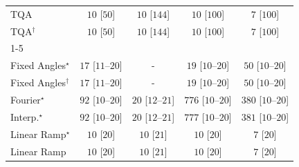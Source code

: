 \begin{tabular}{l|cccc|}
TQA & {\cellcolor[HTML]{F6FCF4}} \color[HTML]{000000} $10$ [$50$] & {\cellcolor[HTML]{F6FCF4}} \color[HTML]{000000} $10$ [$144$] & {\cellcolor[HTML]{F6FCF4}} \color[HTML]{000000} $10$ [$100$] & {\cellcolor[HTML]{F6FCF4}} \color[HTML]{000000} $7$ [$100$] \\
TQA$^\dagger$ & {\cellcolor[HTML]{F6FCF4}} \color[HTML]{000000} $10$ [$50$] & {\cellcolor[HTML]{F6FCF4}} \color[HTML]{000000} $10$ [$144$] & {\cellcolor[HTML]{F6FCF4}} \color[HTML]{000000} $10$ [$100$] & {\cellcolor[HTML]{F6FCF4}} \color[HTML]{000000} $7$ [$100$] \\
\cline{1-5}
\multicolumn{5}{c}{\rule{0pt}{8pt}SV} \\
\midrule
Fixed Angles$^\star$ & {\cellcolor[HTML]{F4FBF2}} \color[HTML]{000000} $17$ [$11$--$20$] & {\cellcolor[HTML]{000000}} \color[HTML]{F1F1F1} {\cellcolor{white}} \color{black} - & {\cellcolor[HTML]{F4FBF2}} \color[HTML]{000000} $19$ [$10$--$20$] & {\cellcolor[HTML]{EEF8EA}} \color[HTML]{000000} $50$ [$10$--$20$] \\
Fixed Angles$^\dagger$ & {\cellcolor[HTML]{F4FBF2}} \color[HTML]{000000} $17$ [$11$--$20$] & {\cellcolor[HTML]{000000}} \color[HTML]{F1F1F1} {\cellcolor{white}} \color{black} - & {\cellcolor[HTML]{F4FBF2}} \color[HTML]{000000} $19$ [$10$--$20$] & {\cellcolor[HTML]{EEF8EA}} \color[HTML]{000000} $50$ [$10$--$20$] \\
Fourier$^\star$ & {\cellcolor[HTML]{E6F5E1}} \color[HTML]{000000} $92$ [$10$--$20$] & {\cellcolor[HTML]{F4FBF1}} \color[HTML]{000000} $20$ [$12$--$21$] & {\cellcolor[HTML]{00441B}} \color[HTML]{F1F1F1} $776$ [$10$--$20$] & {\cellcolor[HTML]{78C679}} \color[HTML]{000000} $380$ [$10$--$20$] \\
Interp.$^\star$ & {\cellcolor[HTML]{E6F5E1}} \color[HTML]{000000} $92$ [$10$--$20$] & {\cellcolor[HTML]{F4FBF1}} \color[HTML]{000000} $20$ [$12$--$21$] & {\cellcolor[HTML]{00441B}} \color[HTML]{F1F1F1} $777$ [$10$--$20$] & {\cellcolor[HTML]{78C679}} \color[HTML]{000000} $381$ [$10$--$20$] \\
Linear Ramp$^\star$ & {\cellcolor[HTML]{F6FCF4}} \color[HTML]{000000} $10$ [$20$] & {\cellcolor[HTML]{F6FCF4}} \color[HTML]{000000} $10$ [$21$] & {\cellcolor[HTML]{F6FCF4}} \color[HTML]{000000} $10$ [$20$] & {\cellcolor[HTML]{F6FCF4}} \color[HTML]{000000} $7$ [$20$] \\
Linear Ramp & {\cellcolor[HTML]{F6FCF4}} \color[HTML]{000000} $10$ [$20$] & {\cellcolor[HTML]{F6FCF4}} \color[HTML]{000000} $10$ [$21$] & {\cellcolor[HTML]{F6FCF4}} \color[HTML]{000000} $10$ [$20$] & {\cellcolor[HTML]{F6FCF4}} \color[HTML]{000000} $7$ [$20$] \\

\end{tabular}
